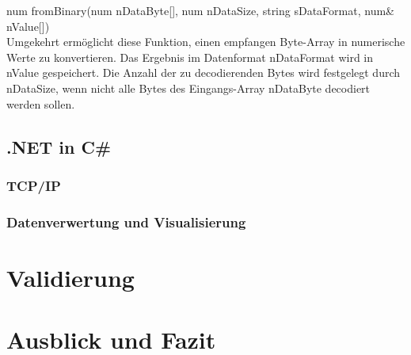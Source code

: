 \documentclass[ a4paper,
                oneside,
                toc=bibliography,
                toc=listof
                ]{scrbook}
\begin{document}
	num fromBinary(num nDataByte[], num nDataSize, string sDataFormat, num\& nValue[])\\
	Umgekehrt ermöglicht diese Funktion, einen empfangen Byte-Array in numerische Werte zu konvertieren. Das Ergebnis im Datenformat nDataFormat wird in nValue gespeichert. Die Anzahl der zu decodierenden Bytes wird festgelegt durch nDataSize, wenn nicht alle Bytes des Eingangs-Array nDataByte decodiert werden sollen.
	
	\section{.NET in C\#}
	
	
	\subsection{TCP/IP}
	
   	\subsection{Datenverwertung und Visualisierung}
   	
   	\chapter{Validierung}
   	
   	\chapter{Ausblick und Fazit}
   	
   	\backmatter
   	
   	
   	\cleardoublepage
   	\listoffigures
   	\cleardoublepage
   	\listoftables
   	\cleardoublepage
   	
   	\cleardoublepage
   	\printbibliography
   	
   
\end{document}
